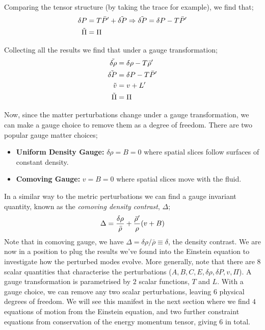 Comparing the tensor structure (by taking the trace for example), we find that;
\begin{align*}
\delta P &= T\bar{P}^{\prime} + \tilde{\delta P} \Rightarrow \tilde{\delta P} = \delta P - T\bar{P}^{\prime} \\
\tilde{\Pi} &= \Pi
\end{align*}
\begin{definitionbox}
Collecting all the results we find that under a gauge transformation;
\begin{align}
\tilde{\delta \rho} &= \delta \rho - T \bar{\rho}^{\prime} \\
\tilde{\delta P} &= \delta P - T \bar{P}^{\prime} \\
\tilde{v} &= v + L^{\prime} \\
\tilde{\Pi} &= \Pi
\end{align}
\end{definitionbox}
Now, since the matter perturbations change under a gauge transformation, we can make a gauge choice to remove them as a degree of freedom. There are two popular gauge matter choices;
\begin{itemize}
\item \textbf{Uniform Density Gauge:} $\delta \rho = B = 0$ where spatial slices follow surfaces of constant density.
\item \textbf{Comoving Gauge:} $v = B = 0$ where spatial slices move with the fluid. 
\end{itemize}
In a similar way to the metric perturbations we can find a gauge invariant quantity, known as the \emph{comoving density contrast}, $\Delta$;
\begin{equation}
\Delta = \frac{\delta \rho}{\bar{\rho}} + \frac{\bar{\rho}^{\prime}}{\rho}(v + B)
\end{equation}
Note that in comoving gauge, we have $\Delta = \delta \rho / \bar{\rho} \equiv \delta$, the density contrast. We are now in a position to plug the results we've found into the Einstein equation to investigate how the perturbed modes evolve. More generally, note that there are $8$ scalar quantities that characterise the perturbations ($A, B, C, E, \delta \rho, \delta P, v, \Pi$). A gauge transformation is parametrised by $2$ scalar functions, $T$ and $L$. With a gauge choice, we can remove any two scalar perturbations, leaving $6$ physical degrees of freedom. We will see this manifest in the next section where we find $4$ equations of motion from the Einstein equation, and two further constraint equations from conservation of the energy momentum tensor, giving $6$ in total.
